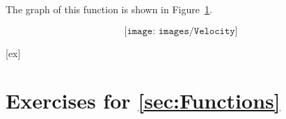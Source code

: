 \begin{solution}
\begin{minipage}{0.5\textwidth}
The graph of this function is shown in Figure~\ref{fig:piecewise velocity}.

\vspace{5mm}
\end{minipage}
\begin{minipage}{0.5\textwidth}	
	
\begin{figure}[H]
	$$\texttt{[image: images/Velocity]}$$
	\caption{ \label{fig:piecewise velocity} } 
\end{figure} 		


\end{minipage} 

\end{solution}
	
\pagebreak
[ex]
\section*{Exercises for \ref{sec:Functions}}

